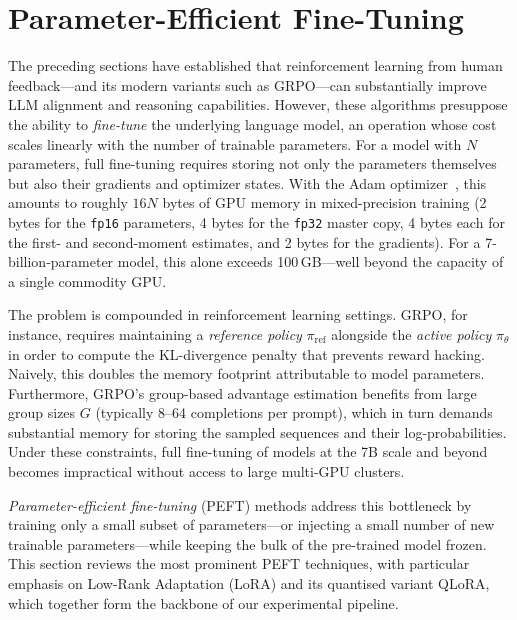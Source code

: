 \section{Parameter-Efficient Fine-Tuning}
\label{sec:peft}

The preceding sections have established that reinforcement learning from
human feedback---and its modern variants such as GRPO---can substantially
improve LLM alignment and reasoning capabilities.  However, these
algorithms presuppose the ability to \emph{fine-tune} the underlying
language model, an operation whose cost scales linearly with the number
of trainable parameters.  For a model with $N$ parameters, full
fine-tuning requires storing not only the parameters themselves but also
their gradients and optimizer states.  With the Adam
optimizer~\citep{kingma2015adam}, this amounts to roughly $16N$ bytes of
GPU memory in mixed-precision training (2 bytes for the \texttt{fp16}
parameters, 4 bytes for the \texttt{fp32} master copy, 4 bytes each for
the first- and second-moment estimates, and 2 bytes for the gradients).
For a 7-billion-parameter model, this alone exceeds 100\,GB---well
beyond the capacity of a single commodity GPU.

The problem is compounded in reinforcement learning settings.  GRPO, for
instance, requires maintaining a \emph{reference policy} $\pi_{\text{ref}}$
alongside the \emph{active policy} $\pi_\theta$ in order to compute the
KL-divergence penalty that prevents reward hacking.  Naively, this doubles
the memory footprint attributable to model parameters.  Furthermore,
GRPO's group-based advantage estimation benefits from large group sizes
$G$ (typically 8--64 completions per prompt), which in turn demands
substantial memory for storing the sampled sequences and their
log-probabilities.  Under these constraints, full fine-tuning of models
at the 7B scale and beyond becomes impractical without access to large
multi-GPU clusters.

\emph{Parameter-efficient fine-tuning} (PEFT) methods address this
bottleneck by training only a small subset of parameters---or injecting
a small number of new trainable parameters---while keeping the bulk of
the pre-trained model frozen.  This section reviews the most prominent
PEFT techniques, with particular emphasis on Low-Rank Adaptation (LoRA)
and its quantised variant QLoRA, which together form the backbone of our
experimental pipeline.

